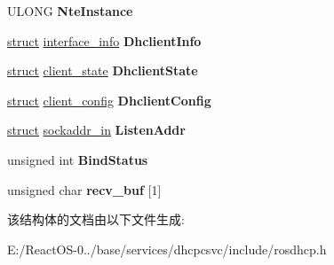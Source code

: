 \begin{DoxyCompactItemize}
U\+L\+O\+NG {\bfseries Nte\+Instance}
\item 
\mbox{\label{struct___d_h_c_p___a_d_a_p_t_e_r_a257913043d35be505b54771443bd5f1c}} 
\hyperlink{interfacestruct}{struct} \hyperlink{structinterface__info}{interface\+\_\+info} {\bfseries Dhclient\+Info}
\item 
\mbox{\label{struct___d_h_c_p___a_d_a_p_t_e_r_a69b04e078b2295cdb7eaa8d6f476f835}} 
\hyperlink{interfacestruct}{struct} \hyperlink{structclient__state}{client\+\_\+state} {\bfseries Dhclient\+State}
\item 
\mbox{\label{struct___d_h_c_p___a_d_a_p_t_e_r_a978f20f24ae2ca2a4340ecdf7eda920c}} 
\hyperlink{interfacestruct}{struct} \hyperlink{structclient__config}{client\+\_\+config} {\bfseries Dhclient\+Config}
\item 
\mbox{\label{struct___d_h_c_p___a_d_a_p_t_e_r_aa863614cc07940bc6e1ef7b99cdded33}} 
\hyperlink{interfacestruct}{struct} \hyperlink{structsockaddr__in}{sockaddr\+\_\+in} {\bfseries Listen\+Addr}
\item 
\mbox{\label{struct___d_h_c_p___a_d_a_p_t_e_r_acd19db4816c157a1efafb4167f1127ae}} 
unsigned int {\bfseries Bind\+Status}
\item 
\mbox{\label{struct___d_h_c_p___a_d_a_p_t_e_r_a221d5a1b360e1cdbd4781ca20d829d2b}} 
unsigned char {\bfseries recv\+\_\+buf} \mbox{[}1\mbox{]}
\end{DoxyCompactItemize}


该结构体的文档由以下文件生成\+:\begin{DoxyCompactItemize}
\item 
E\+:/\+React\+O\+S-\/0../base/services/dhcpcsvc/include/rosdhcp.\+h\end{DoxyCompactItemize}
